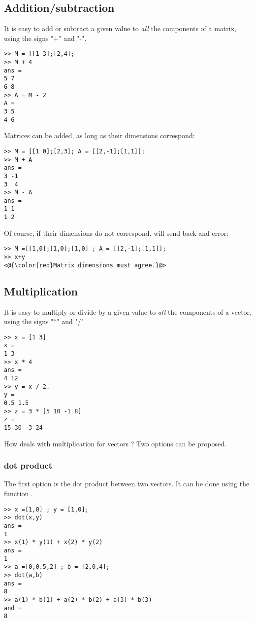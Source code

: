 	\subsection{Addition/subtraction}
		It is easy to add or subtract a given value to \emph{all} the components of a matrix, using the signs "+" and "-".
\begin{lstlisting}
>> M = [[1 3];[2,4];
>> M + 4
ans =
5 7
6 8
>> A = M - 2
A =
3 5
4 6
\end{lstlisting}
		Matrices can be added, as long as their dimensions correspond:
\begin{lstlisting}
>> M = [[1 0];[2,3]; A = [[2,-1];[1,1]];
>> M + A
ans =
3 -1
3  4
>> M - A
ans =
1 1
1 2
\end{lstlisting}
		Of course, if their dimensions do not correspond, \matlab will send back and error:
\begin{lstlisting}
>> M =[[1,0];[1,0];[1,0] ; A = [[2,-1];[1,1]];
>> x+y
<@{\color{red}Matrix dimensions must agree.}@>
\end{lstlisting}

	\subsection{Multiplication}
		It is easy to multiply or divide by a given value to \emph{all} the components of a vector, using the signs "*" and "/"
\begin{lstlisting}
>> x = [1 3]
x = 
1 3
>> x * 4
ans =
4 12
>> y = x / 2.
y =
0.5 1.5
>> z = 3 * [5 10 -1 8]
z = 
15 30 -3 24
\end{lstlisting}
		How \matlab deals with multiplication for vectors ?
		Two options can be proposed.
		\subsubsection{dot product}
			The first option is the dot product between two vectors.
			It can be done using the function .
\begin{lstlisting}
>> x =[1,0] ; y = [1,0];
>> dot(x,y)
ans = 
1
>> x(1) * y(1) + x(2) * y(2)
ans =
1
>> a =[0,0.5,2] ; b = [2,0,4];
>> dot(a,b)
ans = 
8
>> a(1) * b(1) + a(2) * b(2) + a(3) * b(3)    
and =
8
\end{lstlisting}

